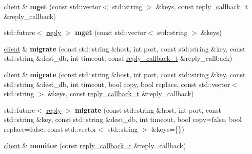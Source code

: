 \begin{DoxyCompactItemize}
\item 
\mbox{\label{classcpp__redis_1_1client_a946b590d9a2a29ee6ae1971b9208a241}} 
\hyperlink{classcpp__redis_1_1client}{client} \& {\bfseries mget} (const std\+::vector$<$ std\+::string $>$ \&keys, const \hyperlink{classcpp__redis_1_1client_a061a1140d36d2eaeda82b09a0bb3f9f2}{reply\+\_\+callback\+\_\+t} \&reply\+\_\+callback)
\item 
\mbox{\label{classcpp__redis_1_1client_a8c08062c8414fd72d1a0b3ef4f44d89d}} 
std\+::future$<$ \hyperlink{classcpp__redis_1_1reply}{reply} $>$ {\bfseries mget} (const std\+::vector$<$ std\+::string $>$ \&keys)
\item 
\mbox{\label{classcpp__redis_1_1client_acfbf3cb40c0cd532e42d725bbda9a03a}} 
\hyperlink{classcpp__redis_1_1client}{client} \& {\bfseries migrate} (const std\+::string \&host, int port, const std\+::string \&key, const std\+::string \&dest\+\_\+db, int timeout, const \hyperlink{classcpp__redis_1_1client_a061a1140d36d2eaeda82b09a0bb3f9f2}{reply\+\_\+callback\+\_\+t} \&reply\+\_\+callback)
\item 
\mbox{\label{classcpp__redis_1_1client_a671442669b8fe540bfc7d02c05a74207}} 
\hyperlink{classcpp__redis_1_1client}{client} \& {\bfseries migrate} (const std\+::string \&host, int port, const std\+::string \&key, const std\+::string \&dest\+\_\+db, int timeout, bool copy, bool replace, const std\+::vector$<$ std\+::string $>$ \&keys, const \hyperlink{classcpp__redis_1_1client_a061a1140d36d2eaeda82b09a0bb3f9f2}{reply\+\_\+callback\+\_\+t} \&reply\+\_\+callback)
\item 
\mbox{\label{classcpp__redis_1_1client_a1bbf11a4ebd3dcf12d9846946e5c3545}} 
std\+::future$<$ \hyperlink{classcpp__redis_1_1reply}{reply} $>$ {\bfseries migrate} (const std\+::string \&host, int port, const std\+::string \&key, const std\+::string \&dest\+\_\+db, int timeout, bool copy=false, bool replace=false, const std\+::vector$<$ std\+::string $>$ \&keys=\{\})
\item 
\mbox{\label{classcpp__redis_1_1client_ad99627cb477d71f07fae0f88ed8ed85b}} 
\hyperlink{classcpp__redis_1_1client}{client} \& {\bfseries monitor} (const \hyperlink{classcpp__redis_1_1client_a061a1140d36d2eaeda82b09a0bb3f9f2}{reply\+\_\+callback\+\_\+t} \&reply\+\_\+callback)

\end{DoxyCompactItemize}
